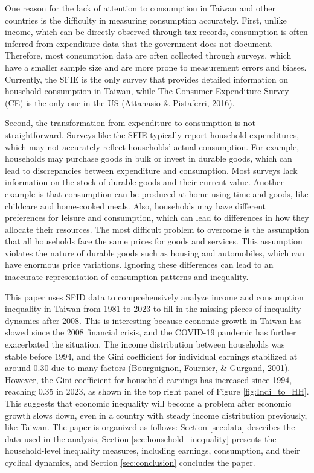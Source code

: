 \documentclass{article}
\begin{document}
One reason for the lack of attention to consumption in Taiwan and other countries is the difficulty in measuring consumption accurately.
First, unlike income, which can be directly observed through tax records, consumption is often inferred from expenditure data that the government does not document.
Therefore, most consumption data are often collected through surveys, which have a smaller sample size and are more prone to measurement errors and biases.
Currently, the SFIE is the only survey that provides detailed information on household consumption in Taiwan, while The Consumer Expenditure Survey (CE) is the only one in the US (Attanasio \& Pistaferri, 2016).

Second, the transformation from expenditure to consumption is not straightforward. Surveys like the SFIE typically report household expenditures, which may not accurately reflect households' actual consumption.
For example, households may purchase goods in bulk or invest in durable goods, which can lead to discrepancies between expenditure and consumption. Most surveys lack information on the stock of durable goods and their current value.
Another example is that consumption can be produced at home using time and goods, like childcare and home-cooked meals. Also, households may have different preferences for leisure and consumption, which can lead to differences in how they allocate their resources.
The most difficult problem to overcome is the assumption that all households face the same prices for goods and services. This assumption violates the nature of durable goods such as housing and automobiles, which can have enormous price variations. Ignoring these differences can lead to an inaccurate representation of consumption patterns and inequality.

This paper uses SFID data to comprehensively analyze income and consumption inequality in Taiwan from 1981 to 2023 to fill in the missing pieces of inequality dynamics after 2008. This is interesting because economic growth in Taiwan has slowed since the 2008 financial crisis, and the COVID-19 pandemic has further exacerbated the situation.
The income distribution between households was stable before 1994, and the Gini coefficient for individual earnings stabilized at around 0.30 due to many factors (Bourguignon, Fournier, \& Gurgand, 2001).
However, the Gini coefficient for household earnings has increased since 1994, reaching 0.35 in 2023, as shown in the top right panel of Figure \ref{fig:Indi_to_HH}.
This suggests that economic inequality will become a problem after economic growth slows down, even in a country with steady income distribution previously, like Taiwan.
The paper is organized as follows: Section \ref{sec:data} describes the data used in the analysis, Section \ref{sec:household_inequality} presents the household-level inequality measures, including earnings, consumption, and their cyclical dynamics, and Section \ref{sec:conclusion} concludes the paper.
\end{document}
